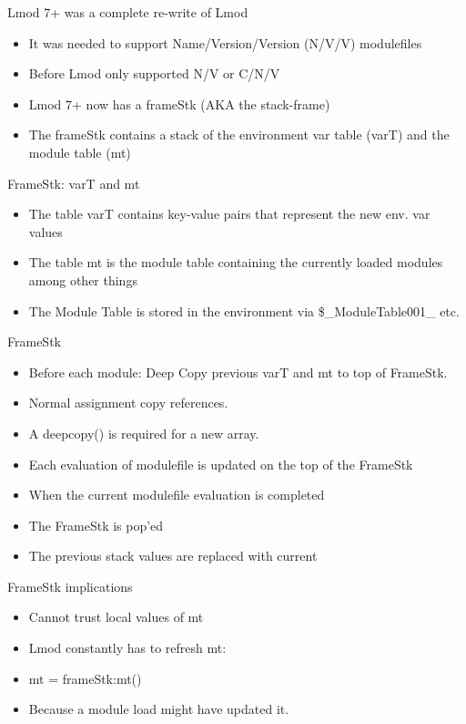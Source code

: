 \documentclass{beamer}
\begin{document}
\begin{frame}{Lmod 7+ was a complete re-write of Lmod}
  \begin{itemize}
    \item It was needed to support Name/Version/Version (N/V/V) modulefiles
    \item Before Lmod only supported N/V or C/N/V
    \item Lmod 7+ now has a frameStk (AKA the stack-frame)
    \item The frameStk contains a stack of the environment var table (varT) and the
      module table (mt)
  \end{itemize}
\end{frame}

\begin{frame}{FrameStk: varT and mt}
  \begin{itemize}
    \item The table varT contains key-value pairs that represent the
      new env. var values
    \item The table mt is the module table containing the currently
      loaded modules among other things
    \item The Module Table is stored in the environment via
      \$\_ModuleTable001\_ etc.
  \end{itemize}
\end{frame}

\begin{frame}{FrameStk}
  \begin{itemize}
    \item Before each module: Deep Copy previous varT and mt to top of
      FrameStk.
    \item Normal assignment copy references.
    \item A deepcopy() is required for a new array.
    \item Each evaluation of modulefile is updated on the top of the
      FrameStk
    \item When the current modulefile evaluation is completed
    \item The FrameStk is pop'ed
    \item The previous stack values are replaced with current
  \end{itemize}
\end{frame}

\begin{frame}{FrameStk implications}
  \begin{itemize}
    \item Cannot trust local values of mt
    \item Lmod constantly has to refresh mt:
    \item {\color{blue}mt = frameStk:mt()}
    \item Because a module load might have updated it.
  \end{itemize}
\end{frame}
\end{document}
